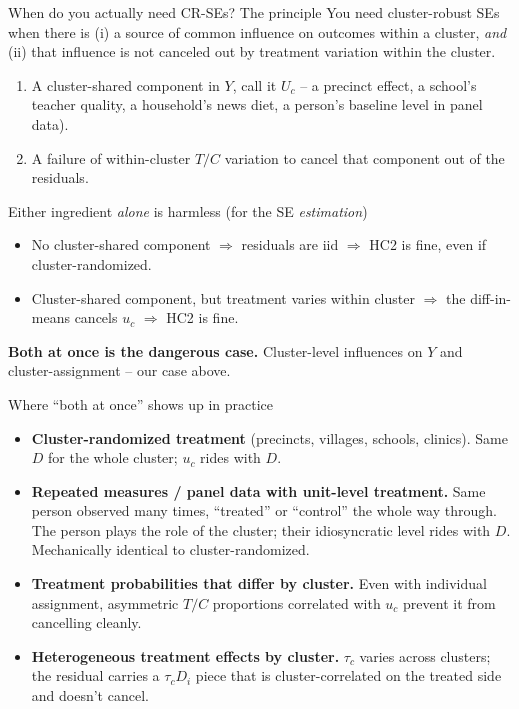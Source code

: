 \documentclass[xcolor=dvipsnames]{beamer}
\begin{document}
\begin{frame}{When do you actually need CR-SEs? The principle}
\small
You need cluster-robust SEs when there is (i) a source of common
influence on outcomes within a cluster, \textit{and} (ii) that influence is
not canceled out by treatment variation within the cluster.
\medskip
\begin{enumerate}
\item<2-> A cluster-shared component in $Y$, call it $U_c$ -- a precinct effect, a
  school's teacher quality, a household's news diet, a person's baseline
  level in panel data).
\item<3-> A failure of within-cluster $T/C$ variation to cancel that
  component out of the residuals.
\end{enumerate}
\medskip
{}
Either ingredient \textit{alone} is harmless (for the SE \textit{estimation})
\begin{itemize}
\footnotesize
\item<4-> No cluster-shared component $\Rightarrow$ residuals are iid
  $\Rightarrow$ HC2 is fine, even if cluster-randomized. 
\item<5-> Cluster-shared component, but treatment varies within
  cluster  $\Rightarrow$ the diff-in-means cancels $u_c$ $\Rightarrow$
  HC2 is fine.
\end{itemize}
\medskip
{}
\textbf{Both at once is the dangerous case.} Cluster-level influences on $Y$ and cluster-assignment -- our case above.
\end{frame}

\begin{frame}{Where ``both at once'' shows up in practice}
\small
\begin{itemize}
\item<1-> \textbf{Cluster-randomized treatment} (precincts, villages,
  schools, clinics). Same $D$ for the whole cluster; $u_c$ rides with $D$.
  \smallskip
\item<2-> \textbf{Repeated measures / panel data with unit-level
  treatment.} Same person observed many times, ``treated'' or ``control''
  the whole way through. The person plays the role of the cluster; their
  idiosyncratic level rides with $D$. Mechanically identical to
  cluster-randomized.
  \smallskip
\item<3-> \textbf{Treatment probabilities that differ by cluster.} Even
  with individual assignment, asymmetric $T/C$ proportions correlated with $u_c$
  prevent it from cancelling cleanly.
  \smallskip
\item<5-> \textbf{Heterogeneous treatment effects by cluster.} $\tau_c$
  varies across clusters; the residual carries a $\tau_c D_i$ piece that
  is cluster-correlated on the treated side and doesn't cancel.
\end{itemize}
\end{frame}
\end{document}

